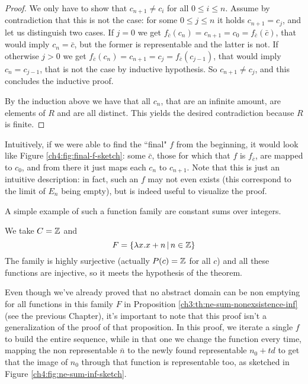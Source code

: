 \begin{proof}
	We only have to show that $c_{n+1} \neq c_i$ for all $0 \le i \le n$. Assume by contradiction that this is not the case: for some $0 \le j \le n$ it holds $c_{n+1} = c_j$, and let us distinguish two cases. If $j = 0$ we get $f_{\bar{c}}(c_n) = c_{n+1} = c_0 = f_{\bar{c}}(\bar{c})$, that would imply $c_n = \bar{c}$, but the former is representable and the latter is not. If otherwise $j > 0$ we get $f_{\bar{c}}(c_n) = c_{n+1} = c_j = f_{\bar{c}}(c_{j-1})$, that would imply $c_n = c_{j-1}$, that is not the case by inductive hypothesis. So $c_{n+1} \neq c_j$, and this concludes the inductive proof.

	By the induction above we have that all $c_n$, that are an infinite amount, are elements of $R$ and are all distinct. This yields the desired contradiction because $R$ is finite.
\end{proof}

Intuitively, if we were able to find the ``final" $f$ from the beginning, it would look like Figure \ref{ch4:fig:final-f-sketch}: some $\bar{c}$, those for which that $f$ is $f_{\bar{c}}$, are mapped to $c_0$, and from there it just maps each $c_n$ to $c_{n+1}$. Note that this is just an intuitive description: in fact, such an $f$ may not even exists (this correspond to the limit of $E_n$ being empty), but is indeed useful to visualize the proof.

A simple example of such a function family are constant sums over integers.
\begin{example}
	We take $C = \mathbb{Z}$ and
	\[
	F = \{ \lambda x. x + n \,\vert\, n \in \mathbb{Z} \}
	\]
	The family is highly surjective (actually $P(c) = \mathbb{Z}$ for all $c$) and all these functions are injective, so it meets the hypothesis of the theorem.
\end{example}

Even though we've already proved that no abstract domain can be non emptying for all functions in this family $F$ in Proposition \ref{ch3:th:ne-sum-nonexsistence-inf} (see the previous Chapter), it's important to note that this proof isn't a generalization of the proof of that proposition. In this proof, we iterate a single $f$ to build the entire sequence, while in that one we change the function every time, mapping the non representable $\bar{n}$ to the newly found representable $n_0 + t d$ to get that the image of $n_0$ through that function is representable too, as sketched in Figure \ref{ch4:fig:ne-sum-inf-sketch}.

